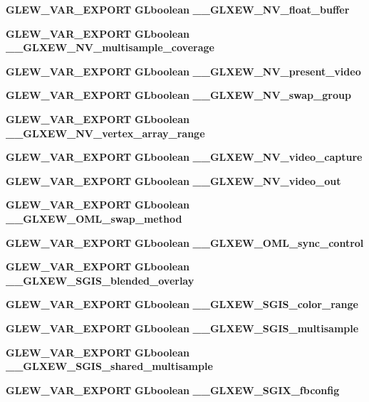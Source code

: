\begin{DoxyCompactItemize}
\item 
{\bf G\+L\+E\+W\+\_\+\+V\+A\+R\+\_\+\+E\+X\+P\+O\+RT} {\bf G\+Lboolean} {\bf \+\_\+\+\_\+\+G\+L\+X\+E\+W\+\_\+\+N\+V\+\_\+float\+\_\+buffer}
\item 
{\bf G\+L\+E\+W\+\_\+\+V\+A\+R\+\_\+\+E\+X\+P\+O\+RT} {\bf G\+Lboolean} {\bf \+\_\+\+\_\+\+G\+L\+X\+E\+W\+\_\+\+N\+V\+\_\+multisample\+\_\+coverage}
\item 
{\bf G\+L\+E\+W\+\_\+\+V\+A\+R\+\_\+\+E\+X\+P\+O\+RT} {\bf G\+Lboolean} {\bf \+\_\+\+\_\+\+G\+L\+X\+E\+W\+\_\+\+N\+V\+\_\+present\+\_\+video}
\item 
{\bf G\+L\+E\+W\+\_\+\+V\+A\+R\+\_\+\+E\+X\+P\+O\+RT} {\bf G\+Lboolean} {\bf \+\_\+\+\_\+\+G\+L\+X\+E\+W\+\_\+\+N\+V\+\_\+swap\+\_\+group}
\item 
{\bf G\+L\+E\+W\+\_\+\+V\+A\+R\+\_\+\+E\+X\+P\+O\+RT} {\bf G\+Lboolean} {\bf \+\_\+\+\_\+\+G\+L\+X\+E\+W\+\_\+\+N\+V\+\_\+vertex\+\_\+array\+\_\+range}
\item 
{\bf G\+L\+E\+W\+\_\+\+V\+A\+R\+\_\+\+E\+X\+P\+O\+RT} {\bf G\+Lboolean} {\bf \+\_\+\+\_\+\+G\+L\+X\+E\+W\+\_\+\+N\+V\+\_\+video\+\_\+capture}
\item 
{\bf G\+L\+E\+W\+\_\+\+V\+A\+R\+\_\+\+E\+X\+P\+O\+RT} {\bf G\+Lboolean} {\bf \+\_\+\+\_\+\+G\+L\+X\+E\+W\+\_\+\+N\+V\+\_\+video\+\_\+out}
\item 
{\bf G\+L\+E\+W\+\_\+\+V\+A\+R\+\_\+\+E\+X\+P\+O\+RT} {\bf G\+Lboolean} {\bf \+\_\+\+\_\+\+G\+L\+X\+E\+W\+\_\+\+O\+M\+L\+\_\+swap\+\_\+method}
\item 
{\bf G\+L\+E\+W\+\_\+\+V\+A\+R\+\_\+\+E\+X\+P\+O\+RT} {\bf G\+Lboolean} {\bf \+\_\+\+\_\+\+G\+L\+X\+E\+W\+\_\+\+O\+M\+L\+\_\+sync\+\_\+control}
\item 
{\bf G\+L\+E\+W\+\_\+\+V\+A\+R\+\_\+\+E\+X\+P\+O\+RT} {\bf G\+Lboolean} {\bf \+\_\+\+\_\+\+G\+L\+X\+E\+W\+\_\+\+S\+G\+I\+S\+\_\+blended\+\_\+overlay}
\item 
{\bf G\+L\+E\+W\+\_\+\+V\+A\+R\+\_\+\+E\+X\+P\+O\+RT} {\bf G\+Lboolean} {\bf \+\_\+\+\_\+\+G\+L\+X\+E\+W\+\_\+\+S\+G\+I\+S\+\_\+color\+\_\+range}
\item 
{\bf G\+L\+E\+W\+\_\+\+V\+A\+R\+\_\+\+E\+X\+P\+O\+RT} {\bf G\+Lboolean} {\bf \+\_\+\+\_\+\+G\+L\+X\+E\+W\+\_\+\+S\+G\+I\+S\+\_\+multisample}
\item 
{\bf G\+L\+E\+W\+\_\+\+V\+A\+R\+\_\+\+E\+X\+P\+O\+RT} {\bf G\+Lboolean} {\bf \+\_\+\+\_\+\+G\+L\+X\+E\+W\+\_\+\+S\+G\+I\+S\+\_\+shared\+\_\+multisample}
\item 
{\bf G\+L\+E\+W\+\_\+\+V\+A\+R\+\_\+\+E\+X\+P\+O\+RT} {\bf G\+Lboolean} {\bf \+\_\+\+\_\+\+G\+L\+X\+E\+W\+\_\+\+S\+G\+I\+X\+\_\+fbconfig}

\end{DoxyCompactItemize}
